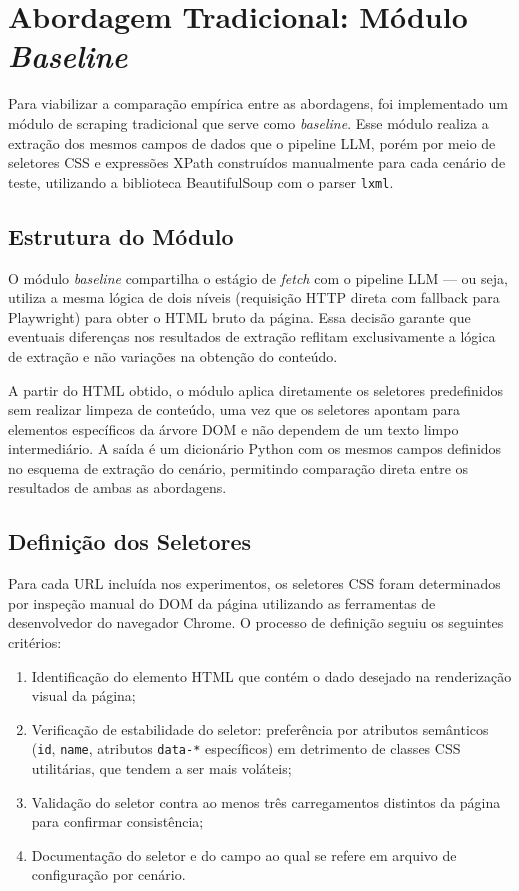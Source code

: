 \documentclass[tcc,capa]{texifsul}
\begin{document}
\section{Abordagem Tradicional: Módulo \textit{Baseline}}

Para viabilizar a comparação empírica entre as abordagens, foi implementado um módulo de scraping tradicional que serve como \textit{baseline}. Esse módulo realiza a extração dos mesmos campos de dados que o pipeline LLM, porém por meio de seletores CSS e expressões XPath construídos manualmente para cada cenário de teste, utilizando a biblioteca BeautifulSoup com o parser \texttt{lxml}.

\subsection*{Estrutura do Módulo}

O módulo \textit{baseline} compartilha o estágio de \textit{fetch} com o pipeline LLM — ou seja, utiliza a mesma lógica de dois níveis (requisição HTTP direta com fallback para Playwright) para obter o HTML bruto da página. Essa decisão garante que eventuais diferenças nos resultados de extração reflitam exclusivamente a lógica de extração e não variações na obtenção do conteúdo.

A partir do HTML obtido, o módulo aplica diretamente os seletores predefinidos sem realizar limpeza de conteúdo, uma vez que os seletores apontam para elementos específicos da árvore DOM e não dependem de um texto limpo intermediário. A saída é um dicionário Python com os mesmos campos definidos no esquema de extração do cenário, permitindo comparação direta entre os resultados de ambas as abordagens.

\subsection*{Definição dos Seletores}

Para cada URL incluída nos experimentos, os seletores CSS foram determinados por inspeção manual do DOM da página utilizando as ferramentas de desenvolvedor do navegador Chrome. O processo de definição seguiu os seguintes critérios:

\begin{enumerate}
    \item Identificação do elemento HTML que contém o dado desejado na renderização visual da página;
    \item Verificação de estabilidade do seletor: preferência por atributos semânticos (\texttt{id}, \texttt{name}, atributos \texttt{data-*} específicos) em detrimento de classes CSS utilitárias, que tendem a ser mais voláteis;
    \item Validação do seletor contra ao menos três carregamentos distintos da página para confirmar consistência;
    \item Documentação do seletor e do campo ao qual se refere em arquivo de configuração por cenário.
\end{enumerate}
\end{document}
